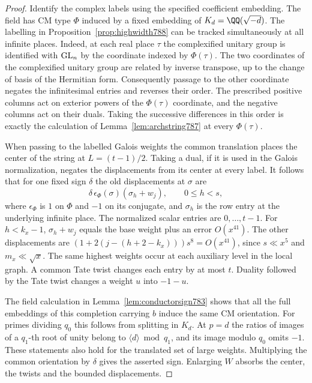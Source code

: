 \documentclass[a4paper,11pt]{article}
\theoremstyle{definition}
\theoremstyle{remark}
\numberwithin{equation}{section}
\begin{document}
\begin{proof}
Identify the complex labels using the specified coefficient
embedding. The field has CM type \(\Phi\) induced by a fixed
embedding of \(K_d=\QQ(\sqrt{-d})\).
The labelling in Proposition~\ref{prop:highwidth788} can be
tracked simultaneously at all infinite places. Indeed, at
each real place \(\tau\) the complexified unitary group is
identified with \({\rm GL}_n\) by the coordinate indexed by
\(\Phi(\tau)\). The two coordinates of the complexified
unitary group are related by inverse transpose, up to the
change of basis of the Hermitian form. Consequently passage
to the other coordinate negates the infinitesimal entries
and reverses their order. The prescribed positive columns
act on exterior powers of the \(\Phi(\tau)\) coordinate,
and the negative columns act on their duals. Taking the
successive differences in this order is exactly the calculation
of Lemma~\ref{lem:archstring787} at every \(\Phi(\tau)\).

When passing to the labelled Galois weights the common
translation places the center of the string at \(L=(t-1)/2\).
Taking a dual, if it is used in the Galois normalization,
negates the displacements from its center at every label.
It follows that for one fixed sign \(\delta\) the old
displacements at \(\sigma\) are
\[
    \delta\,\epsilon_\Phi(\sigma)(\sigma_h+w_j),
       \qquad 0\le h<s ,
\]
where \(\epsilon_\Phi\) is \(1\) on \(\Phi\) and \(-1\) on its
conjugate, and \(\sigma_h\) is the row entry at the underlying
infinite place. The normalized scalar entries are \(0,\ldots,t-1\).
For \(h<k_x-1\), \(\sigma_h+w_j\) equals the base weight plus
an error \(O(x^{41})\). The other displacements are
\((1+2(j-(h+2-k_x)))s^8=O(x^{41})\), since
\(s\ll x^5\) and \(m_x\ll\sqrt{x}\).
The same highest weights occur at each auxiliary level
in the local graph. A common Tate twist changes each
entry by at most \(t\). Duality followed by the Tate
twist changes a weight \(u\) into \(-1-u\).

The field calculation in Lemma~\ref{lem:conductorsign783}
shows that all the full embeddings of this completion
carrying \(b\) induce the same CM orientation. For primes
dividing \(q_0\) this follows from splitting in \(K_d\).
At \(p=d\) the ratios of images of a \(q_1\)-th root of
unity belong to \(\langle d\rangle\bmod q_1\), and its
image modulo \(q_0\) omits \(-1\). These statements also
hold for the translated set of large weights. Multiplying
the common orientation by \(\delta\) gives the asserted
sign. Enlarging \(W\) absorbs the center, the twists and
the bounded displacements.
\end{proof}
\end{document}
